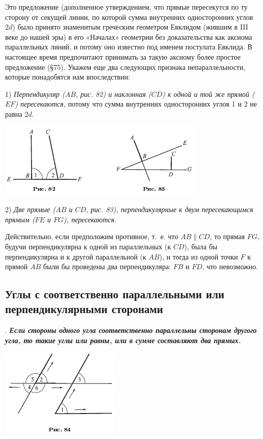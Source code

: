 \documentclass[oneside]{book}
\begin{document}
Это предложение (дополненное утверждением, что прямые пересекутся по ту сторону от секущей линии, по которой сумма внутренних односторонних углов  $2d$) было принято знаменитым греческим геометром Евклидом (жившим в III веке до нашей эры) в его «Началах» геометрии без доказательства как аксиома параллельных линий, и потому оно известно под именем постулата Евклида.
В настоящее время предпочитают принимать за такую аксиому более простое предложение (§75).
Укажем еще два следующих признака непараллельности, которые понадобятся нам впоследствии:

1) \emph{Перпендикуляр \emph{($AB$, рис. 82)} и наклонная \emph{($CD$)} к одной и той же прямой \emph{($EF$)} пересекаются,} потому что сумма внутренних односторонних углов 1 и 2 не равна $2d$.

\includegraphics{pics/ris-82-83}

2) \emph{Две прямые \emph{($AB$ и $CD$, рис. 83),} перпендикулярные к двум пересекающимся прямым \emph{($FE$ и $FG$),} пересекаются.}

Действительно, если предположим противное, т.~е.
что $AB \parallel CD$, то прямая $FG$, будучи перпендикулярна к одной из параллельных (к $CD$), была бы перпендикулярна и к другой параллельной (к $AB$), и тогда из одной точки $F$ к прямой $AB$ были бы проведены два перпендикуляра:
$FB$ и $FD$, что невозможно.

\subsection*{Углы с соответственно параллельными или перпендикулярными сторонами}

.
\textbf{\emph{Если стороны одного угла соответственно параллельны сторонам другого угла, то такие углы или равны, или в сумме составляют два прямых.}}

\includegraphics{pics/ris-84}
\end{document}
